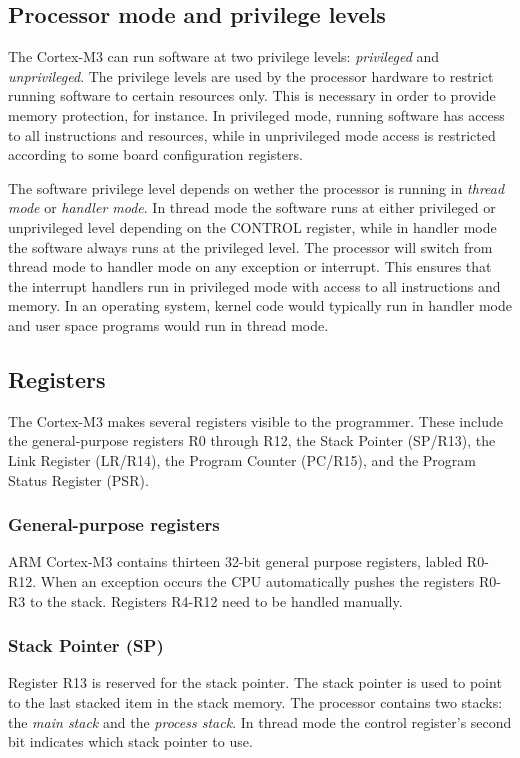 \subsection{Processor mode and privilege levels}
The Cortex-M3 can run software at two privilege levels: \emph{privileged} and \emph{unprivileged}. The privilege levels are used by the processor hardware to restrict running software to certain resources only. This is necessary in order to provide memory protection, for instance. In privileged mode, running software has access to all instructions and resources, while in unprivileged mode access is restricted according to some board configuration registers.

The software privilege level depends on wether the processor is running in \emph{thread mode} or \emph{handler mode}. In thread mode the software runs at either privileged or unprivileged level depending on the CONTROL register, while in handler mode the software always runs at the privileged level. The processor will switch from thread mode to handler mode on any exception or interrupt. This ensures that the interrupt handlers run in privileged mode with access to all instructions and memory. In an operating system, kernel code would typically run in handler mode and user space programs would run in thread mode.\cite{CortexM3-RM}

\subsection{Registers}
The Cortex-M3 makes several registers visible to the programmer. These include the general-purpose registers R0 through R12, the Stack Pointer (SP/R13), the Link Register (LR/R14), the Program Counter (PC/R15), and the Program Status Register (PSR). 

\subsubsection{General-purpose registers}
ARM Cortex-M3 contains thirteen 32-bit general purpose registers, labled R0-R12. When an exception occurs the CPU automatically pushes the registers R0-R3 to the stack. Registers R4-R12 need to be handled manually.

\subsubsection{Stack Pointer (SP)}
Register R13 is reserved for the stack pointer. The stack pointer is used to point to the last stacked item in the stack memory. The processor contains two stacks: the \emph{main stack} and the \emph{process stack}. In thread mode the control register's second bit indicates which stack pointer to use.


